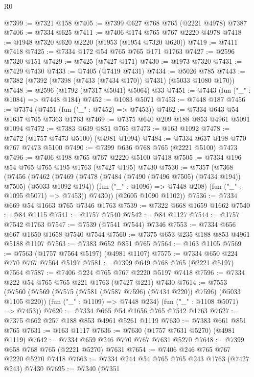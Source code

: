 \begin{lexlean}{R0}
\begin{coremodule}
@7399 := @7321 @158
@7405 := @7399 @627 @768 @765 (@2221 @4978) @7387
@7406 := @7334 @625
@7411 := @7406 @174 @765 @767 @2220 @4978
@7418 := @1948 @7320 @620 @2220 (@1953 (@1954 @7320 @620))
@7419 := @7411 @7418
@7425 := @7334 @172 @54 @765 @765 @171 @1763
@7427 := @2596 @7320 @151
@7429 := @7425 (@7427 @171)
@7430 := @1973 @7320
@7431 := @7429 @7430
@7433 := @7405 (@7419 @7431)
@7434 := @5026 @785
@7443 := @7382 (@7392 (@7398 (@7433 (@7434 @170)) @7431) (@5033 @1080 @170))
@7448 := @2596 (@1792 (@7317 @5041) @5064) @33
@7451 := @7443 (fun ("_" : @1084) => @7448 @184)
@7452 := @1083 @5071
@7453 := @7448 @187
@7456 := @7374 (@7451 (fun ("_" : @7452) => @7453))
@7462 := @7334 @643 @54 @1637 @765 @7363 @1763
@7469 := @7375 @640 @209 @188 @853 @4961 @5091 @1094
@7472 := @7383 @639 @851 @765
@7473 := @163 @1092
@7478 := @7472 (@1757 @7473 @5100) (@4981 @1094)
@7484 := @7334 @637 @198 @770 @767 @7473 @5100
@7490 := @7399 @636 @768 @765 (@2221 @5100) @7473
@7496 := @7406 @198 @765 @767 @2220 @5100 @7418
@7505 := @7334 @196 @54 @765 @765 @195 @1763 (@7427 @195) @7430
@7530 := @7357
    (@7368
      (@7456
        (@7462
          (@7469
            (@7478 (@7484 (@7490 (@7496 @7505) (@7434 @194)) @7505) (@5033 @1092 @194))
            (fun ("_" : @1096) => @7448 @208)
            (fun ("_" : @1095 @5071) => @7453))
          @7430))
      (@2605 @1090 @1102))
@7536 := @7334 @669 @54 @1663 @765 @7346 @1763
@7539 := @7322 @668 @1659 @1662
@7540 := @84 @1115
@7541 := @1757 @7540
@7542 := @84 @1127
@7544 := @1757 @7542 @1763
@7547 := @7539 (@7541 @7544) @7346
@7553 := @7334 @656 @667 @1650 @1658 @7540 @7544
@7560 := @7375 @653 @235 @188 @853 @4961 @5188 @1107
@7563 := @7383 @652 @851 @765
@7564 := @163 @1105
@7569 := @7563 (@1757 @7564 @5197) (@4981 @1107)
@7575 := @7334 @650 @224 @770 @767 @7564 @5197
@7581 := @7399 @649 @768 @765 (@2221 @5197) @7564
@7587 := @7406 @224 @765 @767 @2220 @5197 @7418
@7596 := @7334 @222 @54 @765 @765 @221 @1763 (@7427 @221) @7430
@7614 := @7553
    (@7560
      (@7569 (@7575 (@7581 (@7587 @7596) (@7434 @220)) @7596) (@5033 @1105 @220))
      (fun ("_" : @1109) => @7448 @234)
      (fun ("_" : @1108 @5071) => @7453))
@7620 := @7334 @665 @54 @1656 @765 @7542 @1763
@7627 := @7375 @662 @257 @188 @853 @4961 @5261 @1119
@7630 := @7383 @661 @851 @765
@7631 := @163 @1117
@7636 := @7630 (@1757 @7631 @5270) (@4981 @1119)
@7642 := @7334 @659 @246 @770 @767 @7631 @5270
@7648 := @7399 @658 @768 @765 (@2221 @5270) @7631
@7654 := @7406 @246 @765 @767 @2220 @5270 @7418
@7663 := @7334 @244 @54 @765 @765 @243 @1763 (@7427 @243) @7430
@7695 := @7340
    (@7351

\end{coremodule}
\end{lexlean}
